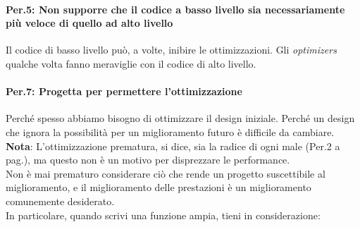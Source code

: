 \paragraph{Per.5: Non supporre che il codice a basso livello sia necessariamente più veloce di quello ad alto livello}

\textsf{\small Il codice di basso livello può, a volte, inibire le ottimizzazioni. Gli \emph{optimizers} qualche volta fanno meraviglie con il codice di alto livello.} \\

\paragraph{Per.7: Progetta per permettere l'ottimizzazione}

\textsf{\small Perché spesso abbiamo bisogno di ottimizzare il design iniziale. Perché un design che ignora la possibilità per un miglioramento futuro è difficile da cambiare.} \\

\textsf{\small \textbf{Nota}: L'ottimizzazione prematura, si dice, sia la radice di ogni male (Per.2 a pag.\pageref{Per_2}), ma questo non è un motivo per disprezzare le performance. } \\

\textsf{\small Non è mai prematuro considerare ciò che rende un progetto suscettibile al miglioramento, e il miglioramento delle prestazioni è un miglioramento comunemente desiderato.} \\

\textsf{\small In particolare, quando scrivi una funzione ampia, tieni in considerazione: } \\

